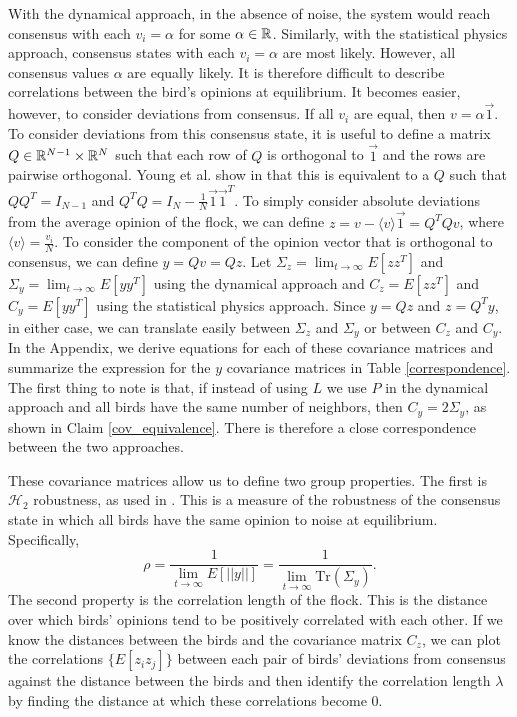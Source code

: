 \documentclass{article}
\newcommand{\Tr}{\text{Tr}}
\begin{document}
With the dynamical approach, in the absence of noise, the system would reach consensus with each $v_i=\alpha$ for some $\alpha\in{\mathbb{R}}$. Similarly, with the statistical physics approach, consensus states with each $v_i=\alpha$ are most likely. However, all consensus values $\alpha$ are equally likely. It is therefore difficult to describe correlations between the bird's opinions at equilibrium. It becomes easier, however, to consider deviations from consensus. If all $v_i$ are equal, then $v=\alpha\vec{1}$. To consider deviations from this consensus state, it is useful to define a matrix $Q\in{\mathbb{R}}^{N-1}\times{\mathbb{R}}^N$ such that each row of $Q$ is orthogonal to $\vec{1}$ and the rows are pairwise orthogonal. Young et al. show in \cite{Young:2010fk,Young:2013kx} that this is equivalent to a $Q$ such that $QQ^T=I_{N-1}$ and $Q^TQ=I_N-\frac{1}{N}\vec{1}\vec{1}^T$. To simply consider absolute deviations from the average opinion of the flock, we can define $z=v-\langle v\rangle \vec{1}=Q^TQv$, where $\langle v \rangle =\frac{v_i}{N}$. To consider the component of the opinion vector that is orthogonal to consensus, we can define $y=Qv=Qz$. Let $\Sigma_z=\lim_{t\to\infty}E[zz^T]$ and $\Sigma_y=\lim_{t\to\infty}E[yy^T]$ using the dynamical approach and $C_z=E[zz^T]$ and $C_y=E[yy^T]$ using the statistical physics approach. Since $y=Qz$ and $z=Q^Ty$, in either case, we can translate easily between $\Sigma_z$ and $\Sigma_y$ or between $C_z$ and $C_y$. In the Appendix, we derive equations for each of these covariance matrices and summarize the expression for the $y$ covariance matrices in Table \ref{correspondence}.  The first thing to note is that, if instead of using $L$ we use $P$ in the dynamical approach and all birds have the same number of neighbors, then $C_y=2\Sigma_y$, as shown in Claim \ref{cov_equivalence}. There is therefore a close correspondence between the two approaches.

These covariance matrices allow us to define two group properties. The first is $\mathscr{H}_2$ robustness, as used in \cite{Young:2010fk,Young:2013kx}. This is a measure of the robustness of the consensus state in which all birds have the same opinion to noise at equilibrium. Specifically, 
\begin{equation}
\rho=\frac{1}{\lim_{t\to\infty}E[||y||]}=\frac{1}{\lim_{t\to\infty}\Tr(\Sigma_y)}. \label{H2def}
\end{equation}
The second property is the correlation length of the flock. This is the distance over which birds' opinions tend to be positively correlated with each other. If we know the distances between the birds and the covariance matrix $C_z$, we can plot the correlations $\{E[z_iz_j]\}$ between each pair of birds' deviations from consensus against the distance between the birds and then identify the correlation length $\lambda$ by finding the distance at which these correlations become $0$.
\end{document}
